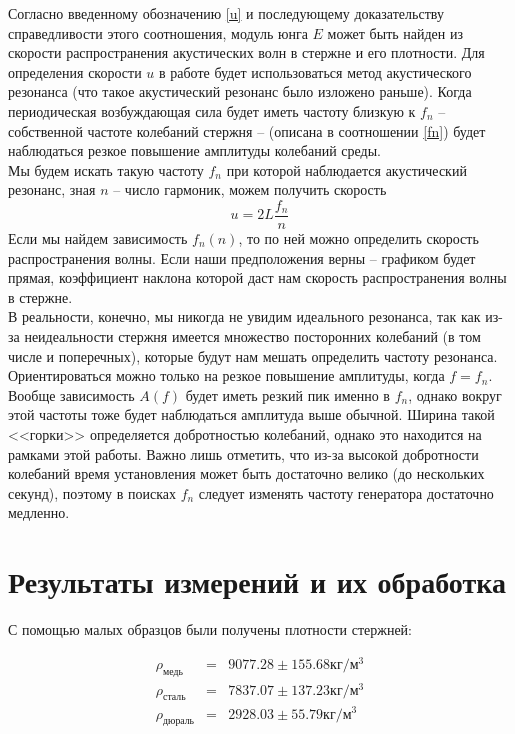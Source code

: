 \documentclass[a4paper,12pt]{article}
\begin{document}
	Согласно введенному обозначению \eqref{u} и последующему доказательству справедливости этого соотношения, модуль юнга $E$ может быть найден из скорости распространения акустических волн в стержне и его плотности. Для определения скорости $u$ в работе будет использоваться метод акустического резонанса (что такое акустический резонанс было изложено раньше). Когда периодическая возбуждающая сила будет иметь частоту близкую к $f_n$ -- собственной частоте колебаний стержня -- (описана в соотношении \eqref{fn}) будет наблюдаться резкое повышение амплитуды колебаний среды.\\
	
	Мы будем искать такую частоту $f_n$ при которой наблюдается акустический резонанс, зная $n$ -- число гармоник, можем получить скорость 
	\begin{equation}
		\label{find_u}
		u=2L\frac{f_n}{n}
	\end{equation}
	Если мы найдем зависимость $f_n(n)$, то по ней можно определить скорость распространения волны. Если наши предположения верны -- графиком будет прямая, коэффициент наклона которой даст нам скорость распространения волны в стержне.\\
	
	В реальности, конечно, мы никогда не увидим идеального резонанса, так как из-за неидеальности стержня имеется множество посторонних колебаний (в том числе и поперечных), которые будут нам мешать определить частоту резонанса. Ориентироваться можно только на резкое повышение амплитуды, когда $f=f_n$.\\
	
	Вообще зависимость $A(f)$ будет иметь резкий пик именно в $f_n$, однако вокруг этой частоты тоже будет наблюдаться амплитуда выше обычной. Ширина такой <<горки>> определяется добротностью колебаний, однако это находится на рамками этой работы. Важно лишь отметить, что из-за высокой добротности колебаний время установления может быть достаточно велико (до нескольких секунд), поэтому в поисках $f_n$ следует изменять частоту генератора достаточно медленно.\\
	
	\section{Результаты измерений и их обработка}
	
	С помощью малых образцов были получены плотности стержней:
	
	\begin{eqnarray}
		\rho_{\text{медь}}&=&9077.28\pm 155.68 \text{кг}/\text{м}^3\\
		\rho_{\text{сталь}}&=&7837.07\pm 137.23
		\text{кг}/\text{м}^3\\
		\rho_{\text{дюраль}}&=&2928.03\pm 55.79
		\text{кг}/\text{м}^3
	\end{eqnarray}
	
\end{document}
